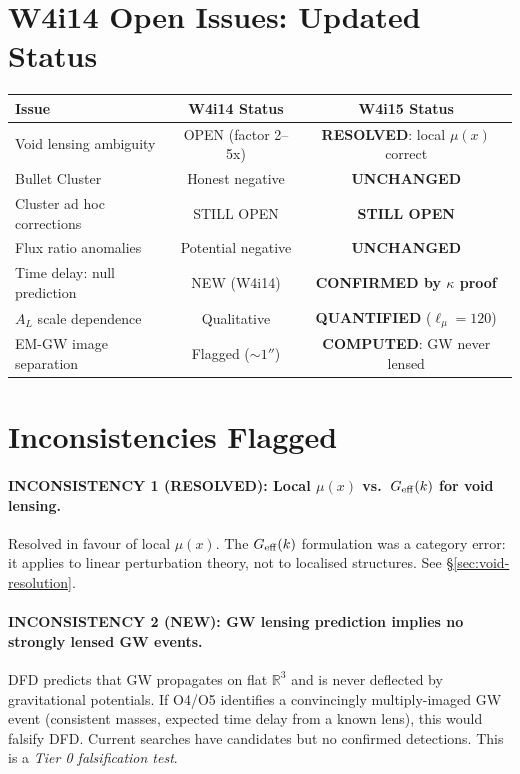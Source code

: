 \documentclass[11pt,a4paper]{article}
\newcommand{\Geff}{G_{\rm eff}}
\begin{document}
\section{W4i14 Open Issues: Updated Status}

\begin{center}
\begin{tabular}{lcc}
\toprule
Issue & W4i14 Status & W4i15 Status \\
\midrule
Void lensing ambiguity & OPEN (factor 2--5x) &
  \textbf{RESOLVED}: local $\mu(x)$ correct \\
Bullet Cluster & Honest negative & \textbf{UNCHANGED} \\
Cluster ad hoc corrections & STILL OPEN & \textbf{STILL OPEN} \\
Flux ratio anomalies & Potential negative & \textbf{UNCHANGED} \\
Time delay: null prediction & NEW (W4i14) & \textbf{CONFIRMED by $\kappa$ proof} \\
$A_L$ scale dependence & Qualitative & \textbf{QUANTIFIED} ($\ell_\mu = 120$) \\
EM-GW image separation & Flagged ($\sim 1''$) &
  \textbf{COMPUTED}: GW never lensed \\
\bottomrule
\end{tabular}
\end{center}


\section{Inconsistencies Flagged}

\paragraph{INCONSISTENCY 1 (RESOLVED): Local $\mu(x)$ vs.\ $\Geff(k)$
for void lensing.}
Resolved in favour of local $\mu(x)$.  The $\Geff(k)$ formulation was
a category error: it applies to linear perturbation theory, not to
localised structures.  See \S\ref{sec:void-resolution}.

\paragraph{INCONSISTENCY 2 (NEW): GW lensing prediction implies
no strongly lensed GW events.}
DFD predicts that GW propagates on flat $\mathbb{R}^3$ and is never
deflected by gravitational potentials.  If O4/O5 identifies a convincingly
multiply-imaged GW event (consistent masses, expected time delay from
a known lens), this would falsify DFD.  Current searches have candidates
but no confirmed detections.  This is a \emph{Tier 0 falsification test}.
\end{document}
